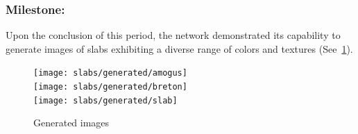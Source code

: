 \subsubsection{Milestone:}
Upon the conclusion of this period, the network demonstrated its capability to generate images of slabs exhibiting a diverse range of colors and textures (See~\ref*{fig:gen-images}).
\begin{figure}[H]
    \centering
    \texttt{[image: slabs/generated/amogus]}
    \\
    \texttt{[image: slabs/generated/breton]}
    \\
    \texttt{[image: slabs/generated/slab]}
    \caption{Generated images}\label{fig:gen-images}
\end{figure}